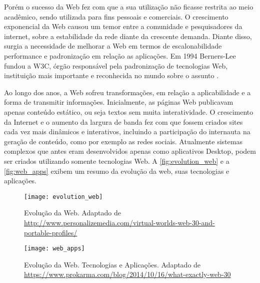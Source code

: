 		Porém o sucesso da Web fez com que a sua utilização não ficasse restrita ao meio acadêmico, sendo utilizada para fins pessoais e comerciais. O crescimento exponencial da Web causou um temor entre a comunidade e pesquisadores da internet, sobre a estabilidade da rede diante da crescente demanda. Diante disso, surgia a necessidade de melhorar a Web em termos de escalonabilidade performance e padronização em relação as aplicações. Em 1994 Berners-Lee fundou a W3C, órgão responsável pela padronização de tecnologias Web, instituição mais importante e reconhecida no mundo sobre o assunto \cite{felipe2008}.
		
		Ao longo dos anos, a Web sofreu transformações, em relação a aplicabilidade e a forma de transmitir informações. Inicialmente, as páginas Web publicavam apenas conteúdo estático, ou seja textos sem muita interatividade. O crescimento da Internet e o aumento da largura de banda fez com que fossem criados sites cada vez mais dinâmicos e interativos, incluindo a participação do internauta na geração de conteúdo, como por exemplo as redes sociais. Atualmente sistemas complexos que antes eram desenvolvidos apenas como aplicativos Desktop, podem ser criados utilizando somente tecnologias Web. A \autoref{fig:evolution_web} e a \autoref{fig:web_apps} exibem um resumo da evolução da web, suas tecnologias e aplicações.
		
		\begin{figure}[!htb]	
			\captionsetup{justification=centering}
			\begin{center}
				\texttt{[image: evolution\_web]}  %
				\caption[Evolução da Web.]{\label{fig:evolution_web} Evolução da Web. Adaptado de \url{http://www.personalizemedia.com/virtual-worlds-web-30-and-portable-profiles/}}
			\end{center}		
		\end{figure}
	
		\begin{figure}[!htb]	
			\captionsetup{justification=centering}
			\begin{center}
				\texttt{[image: web\_apps]}  %
				\caption[Evolução da Web. Tecnologias e Aplicações]{\label{fig:web_apps} Evolução da Web. Tecnologias e Aplicações. Adaptado de \url{https://www.prokarma.com/blog/2014/10/16/what-exactly-web-30}}
			\end{center}		
		\end{figure}
		
